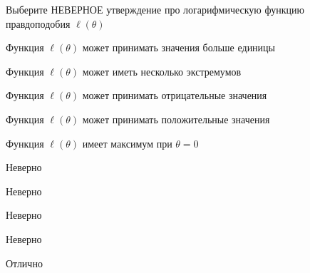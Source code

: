 
\begin{question}
Выберите НЕВЕРНОЕ утверждение про логарифмическую функцию правдоподобия
\(\ell(\theta)\)
\begin{answerlist}
  \item Функция \(\ell(\theta)\) может принимать значения больше единицы
  \item Функция \(\ell(\theta)\) может иметь несколько экстремумов
  \item Функция \(\ell(\theta)\) может принимать отрицательные значения
  \item Функция \(\ell(\theta)\) может принимать положительные значения
  \item Функция \(\ell(\theta)\) имеет максимум при \(\theta=0\)
\end{answerlist}
\end{question}

\begin{solution}
\begin{answerlist}
  \item Неверно
  \item Неверно
  \item Неверно
  \item Неверно
  \item Отлично
\end{answerlist}
\end{solution}

